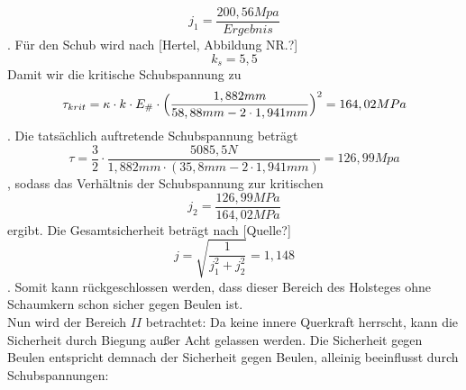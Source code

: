 \begin{equation}
	j_{1}=\frac{200,56 Mpa}{Ergebnis}
\end{equation}. Für den Schub wird nach [Hertel, Abbildung NR.?]
\begin{equation}
	k_{s}=5,5
\end{equation}
Damit wir die kritische Schubspannung zu 
\begin{equation}
	\tau_{krit}=\kappa\cdot k\cdot E_{\#}\cdot\Bigl(\frac{1,88 2mm}{58,88 mm - 2\cdot 1,941  mm}\Bigr)^{2}=164,02 MPa
\end{equation}
. Die tatsächlich auftretende Schubspannung beträgt 
\begin{equation}
	\tau=\frac{3}{2}\cdot \frac{5085,5 N}{1,882 mm\cdot(35,8 mm-2\cdot 1,941 mm)}=126,99 Mpa
\end{equation}
, sodass das Verhältnis der Schubspannung zur kritischen 
\begin{equation}
	j_{2}=\frac{126,99 MPa}{164,02 MPa}
\end{equation}
ergibt. Die Gesamtsicherheit beträgt nach [Quelle?]
\begin{equation}
	j=\sqrt{\frac{1}{j_{1}^{2}+j_{2}^{2}}}=1,148
\end{equation}
. Somit kann rückgeschlossen werden, dass dieser Bereich des Holsteges ohne Schaumkern schon sicher gegen Beulen ist.\\
\noindent Nun wird der Bereich $II$ betrachtet:
Da keine innere Querkraft herrscht, kann die Sicherheit durch Biegung außer Acht gelassen werden. Die Sicherheit gegen Beulen entspricht demnach der Sicherheit gegen Beulen, alleinig beeinflusst durch Schubspannungen:





